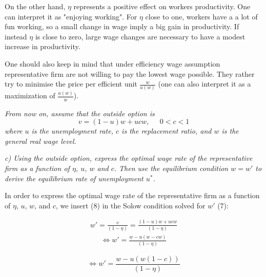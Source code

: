 \documentclass[11pt]{article} %
\begin{document}
On the other hand, $\eta$ represents a positive effect on workers productivity. One can interpret it as "enjoying working". For $\eta$ close to one, workers have a a lot of fun working, so a small change in wage imply a big gain in productivity. If instead $\eta$ is close to zero, large wage changes are necessary to have a modest increase in productivity. \par

One should also keep in mind that under efficiency wage assumption representative firm are not willing to pay the lowest wage possible. They rather try to minimise the price per efficient unit $\frac{w} {a(w)}$ (one can also interpret it as a maximization of $\frac{a(w)} {w}$).




\pagebreak
\textit{From now on, assume that the outside option is}
\begin{equation}
    v = (1-u)w+ucw, \;\;\;\;\; 0<c<1
\end{equation}
\textit{where $u$ is the unemployment rate, $c$ is the replacement ratio, and $w$ is the general real wage level.}



\bigskip
\textit{c) Using the outside option, express the optimal wage rate of the representative firm as a function of $\eta$, $u$, $w$ and $c$. Then use the equilibrium
condition $w=w'$ to derive the equilibrium rate of unemployment $u^*$.} \par
\bigskip
In order to express  the  optimal  wage  rate  of  the  representative  firm  as
a  function  of $\eta$, $u$, $w$, and $c$, we insert (8) in the Solow condition solved for $w'$ (7):

\begin{align*}
    w' = \frac{v} {(1 - \eta)} = \frac{(1-u)w+ucw} {(1 - \eta)}
\end{align*}
\begin{align*}
   \Longleftrightarrow w' = \frac{w - u\left(w - cw\right)} {(1 - \eta)}
\end{align*}

\begin{equation}
   \Longleftrightarrow w' = \frac{w - u\left(w (1 - c)\right)} {(1 - \eta)}
\end{equation}
\end{document}
